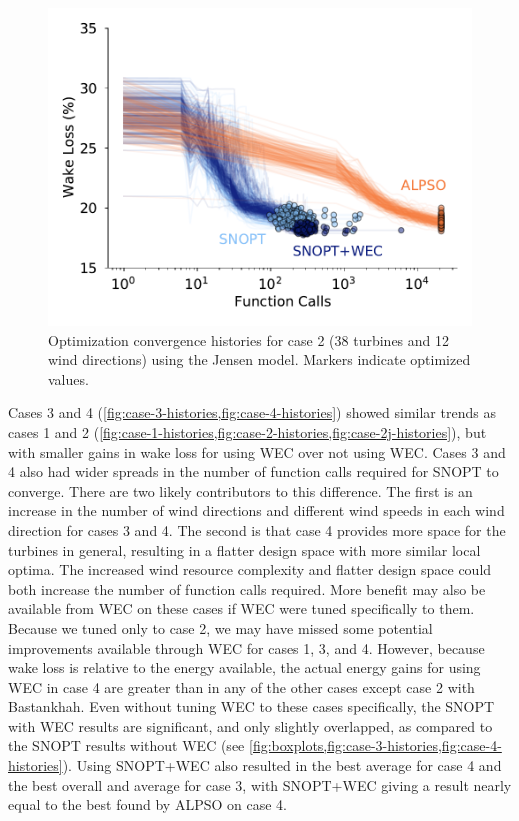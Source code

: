 \documentclass[hidelinks,sort&compress,AMA,STIX1COL]{WileyNJD-v2}
\providecommand{\DIFaddbeginFL}{} %
\providecommand{\DIFaddendFL}{} %
\providecommand{\DIFdelendFL}{} %
\newcommand{\DIFaddincludegraphics}[2][]{{\color{blue}\fbox{\DIFOincludegraphics[#1]{#2}}}} %
\DeclareRobustCommand{\DIFaddbeginFL}{\DIFOaddbeginFL \let\includegraphics\DIFaddincludegraphics} %
\DeclareRobustCommand{\DIFaddendFL}{\DIFOaddendFL \let\includegraphics\DIFOincludegraphics} %
\DeclareRobustCommand{\DIFdelendFL}{\DIFOaddendFL \let\includegraphics\DIFOincludegraphics} %
\begin{document}
\begin{figure}[h!]
\begin{minipage}[t]{0.45\textwidth}
\DIFdelendFL \DIFaddbeginFL \includegraphics[width=\textwidth]{final_images/results/Figure_22}  
		\DIFaddendFL \caption{Optimization convergence histories for case 2 (38 turbines and 12 wind directions) using the Jensen model. Markers indicate optimized values.}
		\label{fig:case-2j-histories}
	\end{minipage}
\end{figure}

Cases 3 and 4 (\cref{fig:case-3-histories,fig:case-4-histories}) showed similar trends as cases 1 and 2 (\cref{fig:case-1-histories,fig:case-2-histories,fig:case-2j-histories}), but with smaller gains in wake loss for using WEC over not using WEC. Cases 3 and 4 also had wider spreads in the number of function calls required for SNOPT to converge. There are two likely contributors to this difference. The first is an increase in the number of wind directions and different wind speeds in each wind direction for cases 3 and 4. The second is that case 4 provides more space for the turbines in general, resulting in a flatter design space with more similar local optima. The increased wind resource complexity and flatter design space could both increase the number of function calls required. More benefit may also be available from WEC on these cases if WEC were tuned specifically to them. Because we tuned only to case 2, we may have missed some potential improvements available through WEC for cases 1, 3, and 4. However, because wake loss is relative to the energy available, the actual energy gains for using WEC in case 4 are greater than in any of the other cases except case 2 with Bastankhah.  Even without tuning WEC to these cases specifically, the SNOPT with WEC results are significant, and only slightly overlapped, as compared to the SNOPT results without WEC (see \cref{fig:boxplots,fig:case-3-histories,fig:case-4-histories}). Using SNOPT+WEC also resulted in the best average for case 4 and the best overall and average for case 3, with SNOPT+WEC giving a result nearly equal to the best found by ALPSO on case 4.
\end{document}
